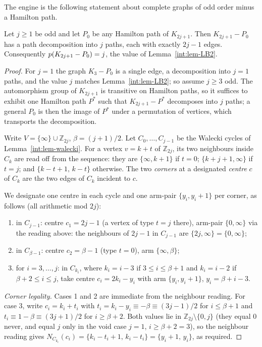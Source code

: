 The engine is the following statement about complete graphs of odd order
minus a Hamilton path.

\begin{theorem}\label{thm:conL0}
Let $j\ge1$ be odd and let $P_0$ be any Hamilton path of $K_{2j+1}$. Then
$K_{2j+1}-P_0$ has a path decomposition into $j$ paths, each with exactly
$2j-1$ edges. Consequently $p(K_{2j+1}-P_0)=j$, the value of
Lemma~\ref{int:lem-LB2}.
\end{theorem}

\begin{proof}
For $j=1$ the graph $K_3-P_0$ is a single edge, a decomposition into
$j=1$ paths, and the value $j$ matches Lemma~\ref{int:lem-LB2}; so assume
$j\ge3$ odd. The automorphism group of $K_{2j+1}$ is transitive on
Hamilton paths, so it suffices to exhibit one Hamilton path $P^*$ such
that $K_{2j+1}-P^*$ decomposes into $j$ paths; a general $P_0$ is then the
image of $P^*$ under a permutation of vertices, which transports the
decomposition.

Write $V=\{\infty\}\cup\mathbb{Z}_{2j}$, $\beta=(j+1)/2$. Let
$C_0,\dots,C_{j-1}$ be the Walecki cycles of Lemma~\ref{int:lem-walecki}. For
a vertex $v=k+t$ of $\mathbb{Z}_{2j}$, its two neighbours inside $C_k$ are
read off from the sequence: they are $\{\infty,k+1\}$ if $t=0$;
$\{k+j+1,\infty\}$ if $t=j$; and $\{k-t+1,\,k-t\}$ otherwise. The two
\emph{corners} at a designated \emph{centre} $c$ of $C_k$ are the two
edges of $C_k$ incident to $c$.

We designate one centre in each cycle and one arm-pair $\{y_i,y_i+1\}$ per
corner, as follows (all arithmetic mod $2j$):
\begin{enumerate}[label=\arabic*.,leftmargin=2em]
\item in $C_{j-1}$: centre $c_1=2j-1$ (a vertex of type $t=j$ there),
arm-pair $\{0,\infty\}$ via the reading above: the neighbours of $2j-1$ in
$C_{j-1}$ are $\{2j,\infty\}=\{0,\infty\}$;
\item in $C_{\beta-1}$: centre $c_2=\beta-1$ (type $t=0$), arm
$\{\infty,\beta\}$;
\item for $i=3,\dots,j$: in $C_{k_i}$, where $k_i=i-3$ if $3\le i\le\beta+1$
and $k_i=i-2$ if $\beta+2\le i\le j$, take centre $c_i=2k_i-y_i$ with arm
$\{y_i,y_i+1\}$, $y_i=\beta+i-3$.
\end{enumerate}
\emph{Corner legality.} Cases 1 and 2 are immediate from the neighbour
reading. For case 3, write $c_i=k_i+t_i$ with
$t_i=k_i-y_i\equiv-\beta\equiv(3j-1)/2$ for $i\le\beta+1$ and
$t_i\equiv 1-\beta\equiv(3j+1)/2$ for $i\ge\beta+2$. Both values lie in
$\mathbb{Z}_{2j}\setminus\{0,j\}$ (they equal $0$ never, and equal $j$
only in the void case $j=1$, $i\ge\beta+2=3$), so the neighbour reading
gives $N_{C_{k_i}}(c_i)=\{k_i-t_i+1,\,k_i-t_i\}=\{y_i+1,\,y_i\}$, as
required.


\end{proof}
